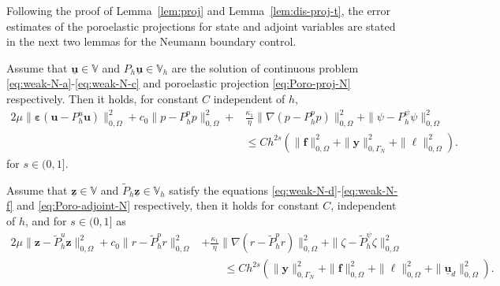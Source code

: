\documentclass[smallextended]{svjour3}
\numberwithin{equation}{section}
\numberwithin{figure}{section}
\numberwithin{table}{section}
\newcommand\ff{\boldsymbol{f}}
\newcommand\beps{\boldsymbol{\varepsilon}}
\newcommand{\tP}{\tilde{P}}
\newcommand\buu{\underline{\boldsymbol{u}}}
\newcommand\buz{\underline{\boldsymbol{z}}}
\newcommand\by{\boldsymbol{y}}
\newcommand\bu{\boldsymbol{u}}
\newcommand\bz{\boldsymbol{z}}
\newcommand{\bbV}{\mathbb{V}}
\begin{document}
    Following the proof of Lemma~\ref{lem:proj} and Lemma~\ref{lem:dis-proj-t}, the error estimates of the poroelastic projections for state and adjoint variables are stated in the next two lemmas for the Neumann boundary control.
    \begin{lemma} \label{lem:proj}
		Assume that $\buu \in \bbV$ and $P_h \buu \in \bbV_h$ are the solution of continuous problem  \eqref{eq:weak-N-a}-\eqref{eq:weak-N-c} and poroelastic projection \eqref{eq:Poro-proj-N} respectively.
		 Then it holds, for constant $C$ independent of $h$,
		\begin{equation}\label{est:proj-D}
			\begin{aligned} 
			2 \mu \| \beps(\bu - P_h^u \bu) \|_{0, \Omega}^2  + c_0 \| p - P_h^p p \|_{0, \Omega}^2 + & \frac{\kappa_1}{\eta} \| \nabla (p - P_h^p p)\|_{0, \Omega}^2+ \| \psi - P_h^{\psi} \psi \|_{0, \Omega}^2 \\
			& \le C h^{2s} ( \|\ff \|_{0, \Omega}^2 + \|\by \|_{0, \Gamma_N}^2 + \|\ell\|_{0, \Omega}^2  ).
		\end{aligned}
	\end{equation}
	for $s \in (0,1]$.
	\end{lemma}

\begin{lemma} \label{lem:proj-adjoint}
	Assume that $\buz \in \bbV$ and $\tP_h \buz \in \bbV_h$ satisfy the equations \eqref{eq:weak-N-d}-\eqref{eq:weak-N-f} and \eqref{eq:Poro-adjoint-N} respectively, then it holds for constant $C$, independent of $h$, and for $s \in (0, 1]$ as
	 \begin{equation}\label{est:adjointproj-N}
	 	\begin{aligned} 
	 		2 \mu \| \bz - \tP_h^u \bz \|_{0, \Omega}^2 + c_0 \| r - \tP_h^p r \|_{0, \Omega}^2 & + \frac{\kappa_1}{\eta} \| \nabla (r - \tP_h^p r )\|_{0, \Omega}^2+ \| \zeta - \tP_h^{\psi} \zeta \|_{0, \Omega}^2 \\
	 		&\qquad \le C h^{2s} (
            \|\by \|_{0, \Gamma_N}^2 + \|\ff \|_{0, \Omega}^2 + \|\ell\|_{0, \Omega}^2 + \| \buu_d\|_{0, \Omega}^2 ).
	 	\end{aligned}
	  \end{equation}
	\end{lemma}
\end{document}
